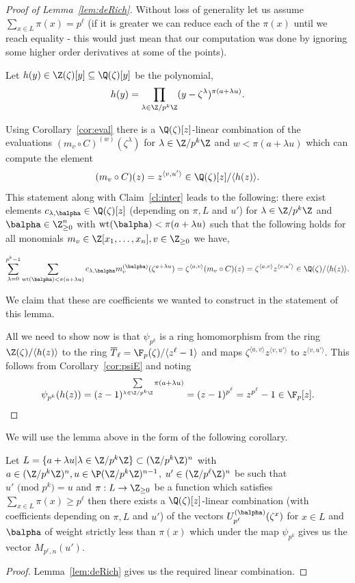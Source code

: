 \begin{proof}[Proof of Lemma~\ref{lem:deRich}]
Without loss of generality let us assume $\sum_{x\in L} \pi(x)=p^\ell$ (if it is greater we can reduce each of the $\pi(x)$ until we reach equality - this would just mean that our computation was done by ignoring some higher order derivatives at some of the points).

Let $h(y)\in \Z(\zeta)[y]\subseteq \Q(\zeta)[y]$ be the polynomial,
$$h(y)= \prod\limits_{\lambda \in \Z/p^k\Z}(y-\zeta^{\lambda})^{\pi(a+\lambda u)}.$$

Using Corollary~\ref{cor:eval} there is a $\Q(\zeta)[z]$-linear combination of the evaluations  $(m_v\circ C)^{(w)}(\zeta^\lambda)$ for $\lambda \in \Z/p^k\Z$ and $w<\pi(a+\lambda u)$ which can compute the element 
$$(m_v\circ C)(z)=z^{\langle v,u'\rangle} \in \Q(\zeta)[z]/\langle h(z)\rangle.$$ 
This statement along with Claim~\ref{cl:inter} leads to the following: there exist elements $c_{\lambda,\balpha} \in \Q(\zeta)[z]$ (depending on $\pi,L$ and $u'$) for $\lambda \in \Z/p^k\Z$ and $\balpha\in  \Z_{\ge 0}^n$ with $\text{wt}(\balpha)< \pi(a+\lambda u)$ such that the following holds for all monomials $m_v\in \Z[x_1,\hdots,x_n],v\in \Z_{\ge 0}$ we have,

$$\sum\limits_{\lambda =0}^{p^k-1}\sum\limits_{\text{wt}(\balpha) < \pi(a+\lambda u) }c_{\lambda,\balpha} m_v^{(\balpha)}(\zeta^{a+\lambda u})=\zeta^{\langle a,v\rangle} (m_v\circ C)(z)=\zeta^{\langle a,v\rangle}z^{\langle v,u'\rangle} \in \Q(\zeta)/\langle h(z)\rangle.$$

We claim that these are coefficients we wanted to construct in the statement of this lemma. 

All we need to show now is that $\psi_{p^k}$ is a ring homomorphism from the ring $\Z(\zeta)/\langle h(z)\rangle$ to the ring $\overline{T}_\ell=\F_p(\zeta)/\langle z^\ell -1\rangle$ and maps $\zeta^{\langle a,v\rangle}z^{\langle v,u'\rangle}$ to $z^{\langle v,u'\rangle}$. This follows from Corollary~\ref{cor:psiE} and noting 
$$\psi_{p^k}(h(z))=(z-1)^{\sum\limits_{\lambda \in\Z/p^k\Z} \pi(a+\lambda u)}=(z-1)^{p^\ell}=z^{p^\ell}-1\in \F_p[z].$$

\end{proof}

We will use the lemma above in the form of the following corollary.

\begin{cor}\label{lem:decoding}
Let $L=\{a+\lambda u| \lambda \in \Z/p^k\Z\}\subset (\Z/p^k\Z)^n$ with $a\in (\Z/p^k\Z)^n,u\in \P (\Z/p^k\Z)^{n-1}$, $u'\in (\Z/p^\ell\Z)^n$ be such that {\em $u'\text{ (mod }p^k\text{)}=u$} and $\pi:L\rightarrow \Z_{\ge 0}$ be a function which satisfies $\sum_{x\in L} \pi(x) \ge p^\ell$ then there exists a $\Q(\zeta)[z]$-linear combination (with coefficients depending on $\pi,L$ and $u'$) of the vectors $U_{p^\ell}^{(\balpha)}(\zeta^x)$ for $x\in L$ and $\balpha$ of weight strictly less than $\pi(x)$ which under the map $\psi_{p^k}$ gives us the vector $M_{p^\ell,n}(u')$.
\end{cor}
\begin{proof}
Lemma~\ref{lem:deRich} gives us the required linear combination.
\end{proof}

